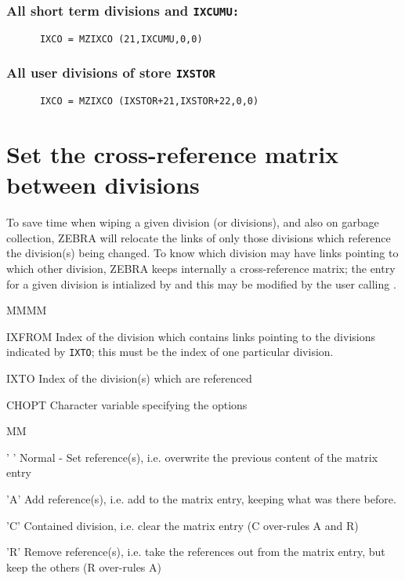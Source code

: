\subsubsection{All short term divisions and \tt IXCUMU:}
\begin{verbatim}
      IXCO = MZIXCO (21,IXCUMU,0,0)
\end{verbatim}
\subsubsection{All user divisions of store \tt IXSTOR}
\begin{verbatim}
      IXCO = MZIXCO (IXSTOR+21,IXSTOR+22,0,0)
\end{verbatim}
\section{Set the cross-reference matrix between divisions}
\par To save time when wiping a given division (or divisions),
and also on garbage collection,
ZEBRA will relocate the links of only those divisions
which reference the division(s) being changed.
To know which division may have links pointing
to which other division,
ZEBRA keeps internally a cross-reference matrix;
the entry for a given division is intialized by 
and this may be modified by the user calling .
\Idesc
\begin{DL}{MMMM}
\item[IXFROM]Index of the division which contains links
pointing to the divisions indicated by {\tt IXTO};
this must be the index of one particular division.
\item[IXTO]Index of the division(s) which are referenced
\item[CHOPT]Character variable specifying the options
\begin{DL}{MM}
\item[' ']Normal - Set reference(s), i.e. overwrite the previous
content of the matrix entry
\item['A']Add reference(s), i.e. add to the matrix entry,
keeping what was there before.
\item['C']Contained division, i.e. clear the matrix entry
(C over-rules A and R)
\item['R']Remove reference(s), i.e. take the references
out from the matrix entry, but keep the others (R over-rules A)
\end{DL}
\end{DL}
